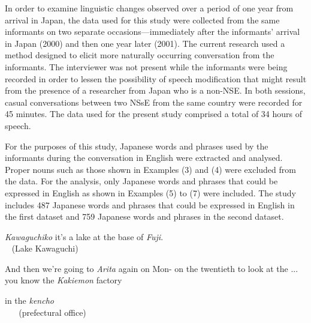 \documentclass[output=paper]{LSP/langsci}
\begin{document}
In order to examine linguistic changes observed over a period of one year from arrival in Japan, the data used for this study were collected from the same informants on two separate occasions—immediately after the informants’ arrival in Japan (2000) and then one year later (2001). The current research used a method designed to elicit more naturally occurring conversation from the informants. The interviewer was not present while the informants were being recorded in order to lessen the possibility of speech modification that might result from the presence of a researcher from Japan who is a non-NSE. In both sessions, casual conversations between two NSsE from the same country were recorded for 45 minutes. The data used for the present study comprised a total of 34 hours of speech.

For the purposes of this study, Japanese words and phrases used by the informants during the conversation in English were extracted and analysed. Proper nouns such as those shown in Examples (3) and (4) were excluded from the data. For the analysis, only Japanese words and phrases that could be expressed in English as shown in Examples (5) to (7) were included. The study includes 487 Japanese words and phrases that could be expressed in English in the first dataset and 759 Japanese words and phrases in the second dataset.


\ea
{} {\textit{Kawaguchiko}} it's a lake at the base of \textit{Fuji}.\\
{~} {(Lake Kawaguchi)} {~}\\
\z

\begin{exe}
\label{ex:4}
\ex And then we're going to \textit{Arita} again on Mon- on the twentieth to look at the ... you know the \textit{Kakiemon} factory
\end{exe}


\ea
{} {in the} {\textit{kencho}}\\
{~} {~} {(prefectural office)}\\
\z
\end{document}
